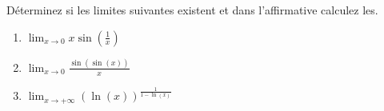 
\begin{exercice}\label{exo0024}

Déterminez si les limites suivantes existent et dans l'affirmative calculez les.
\begin{enumerate}
	\item  $\lim_{x \rightarrow  0} x \sin(\frac{1}{x}) $
	\item  $\lim_{x \rightarrow  0} \frac{\sin(\sin(x))}{x} $
	\item  $\lim_{x \rightarrow  +\infty} (\ln(x))^\frac{1}{1 - \ln(x)}$
\end{enumerate}

\end{exercice}

